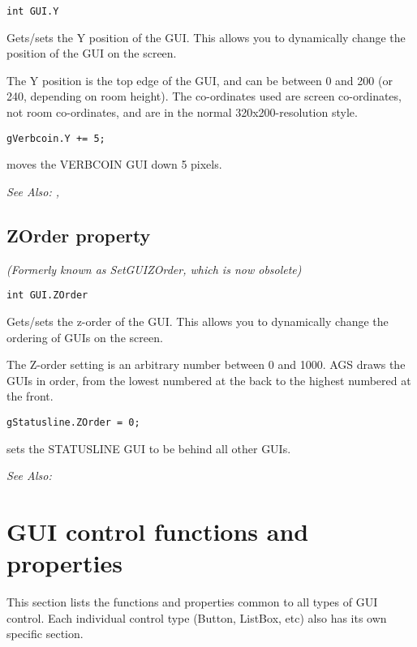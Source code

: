 \begin{verbatim}
int GUI.Y
\end{verbatim}
Gets/sets the Y position of the GUI. This allows you to dynamically change the position
of the GUI on the screen.

The Y position is the top edge of the GUI, and can be between 0 and 200 (or 240, depending
on room height). The co-ordinates used are screen co-ordinates, not room co-ordinates,
and are in the normal 320x200-resolution style.

\begin{verbatim}
gVerbcoin.Y += 5;
\end{verbatim}

moves the VERBCOIN GUI down 5 pixels.

\it{See Also:} , 


\subsection{ZOrder property}\label{GUI.ZOrder}%

\it{(Formerly known as SetGUIZOrder, which is now obsolete)}

\begin{verbatim}
int GUI.ZOrder
\end{verbatim}
Gets/sets the z-order of the GUI. This allows you to dynamically change the ordering
of GUIs on the screen.

The Z-order setting is an arbitrary number between 0 and 1000. AGS draws the GUIs
in order, from the lowest numbered at the back to the highest numbered at the front.

\begin{verbatim}
gStatusline.ZOrder = 0;
\end{verbatim}

sets the STATUSLINE GUI to be behind all other GUIs.

\it{See Also:} 




\section{GUI control functions and properties}

This section lists the functions and properties common to all types of GUI control.
Each individual control type (Button, ListBox, etc) also has its own specific section.



